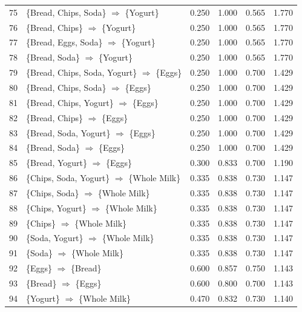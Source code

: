 \documentclass[12pt,letterpaper, onecolumn]{exam}
\begin{document}
\begin{questions}
\begin{solution}
{\begin{longtable}{|c|l|c|c|c|c|}
            75 & \{Bread, Chips, Soda\} $\Rightarrow$ \{Yogurt\} & 0.250 & 1.000 & 0.565 & 1.770 \\
            76 & \{Bread, Chips\} $\Rightarrow$ \{Yogurt\} & 0.250 & 1.000 & 0.565 & 1.770 \\
            77 & \{Bread, Eggs, Soda\} $\Rightarrow$ \{Yogurt\} & 0.250 & 1.000 & 0.565 & 1.770 \\
            78 & \{Bread, Soda\} $\Rightarrow$ \{Yogurt\} & 0.250 & 1.000 & 0.565 & 1.770 \\
            79 & \{Bread, Chips, Soda, Yogurt\} $\Rightarrow$ \{Eggs\} & 0.250 & 1.000 & 0.700 & 1.429 \\
            80 & \{Bread, Chips, Soda\} $\Rightarrow$ \{Eggs\} & 0.250 & 1.000 & 0.700 & 1.429 \\
            81 & \{Bread, Chips, Yogurt\} $\Rightarrow$ \{Eggs\} & 0.250 & 1.000 & 0.700 & 1.429 \\
            82 & \{Bread, Chips\} $\Rightarrow$ \{Eggs\} & 0.250 & 1.000 & 0.700 & 1.429 \\
            83 & \{Bread, Soda, Yogurt\} $\Rightarrow$ \{Eggs\} & 0.250 & 1.000 & 0.700 & 1.429 \\
            84 & \{Bread, Soda\} $\Rightarrow$ \{Eggs\} & 0.250 & 1.000 & 0.700 & 1.429 \\
            85 & \{Bread, Yogurt\} $\Rightarrow$ \{Eggs\} & 0.300 & 0.833 & 0.700 & 1.190 \\
            86 & \{Chips, Soda, Yogurt\} $\Rightarrow$ \{Whole Milk\} & 0.335 & 0.838 & 0.730 & 1.147 \\
            87 & \{Chips, Soda\} $\Rightarrow$ \{Whole Milk\} & 0.335 & 0.838 & 0.730 & 1.147 \\
            88 & \{Chips, Yogurt\} $\Rightarrow$ \{Whole Milk\} & 0.335 & 0.838 & 0.730 & 1.147 \\
            89 & \{Chips\} $\Rightarrow$ \{Whole Milk\} & 0.335 & 0.838 & 0.730 & 1.147 \\
            90 & \{Soda, Yogurt\} $\Rightarrow$ \{Whole Milk\} & 0.335 & 0.838 & 0.730 & 1.147 \\
            91 & \{Soda\} $\Rightarrow$ \{Whole Milk\} & 0.335 & 0.838 & 0.730 & 1.147 \\
            92 & \{Eggs\} $\Rightarrow$ \{Bread\} & 0.600 & 0.857 & 0.750 & 1.143 \\
            93 & \{Bread\} $\Rightarrow$ \{Eggs\} & 0.600 & 0.800 & 0.700 & 1.143 \\
            94 & \{Yogurt\} $\Rightarrow$ \{Whole Milk\} & 0.470 & 0.832 & 0.730 & 1.140 \\

\end{longtable}}
\end{solution}
\end{questions}
\end{document}
